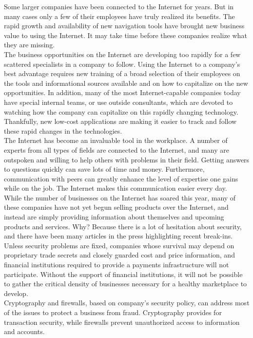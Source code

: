 Some larger companies have been connected to the Internet for years.
But in many cases only a few of their employees have truly realized its
benefits. The rapid growth and availability of new navigation tools
have brought new business value to using the Internet. It may take time
before these companies realize what they are missing.\\

The business opportunities on the Internet are developing too rapidly
for a few scattered specialists in a company to follow. Using the
Internet to a company's best advantage requires new training of a broad
selection of their employees on the tools and informational sources
available and on how to capitalize on the new opportunities. In
addition, many of the most Internet-capable companies today have
special internal teams, or use outside consultants, which are devoted
to watching how the company can capitalize on this rapidly changing
technology. Thankfully, new low-cost applications are making it easier
to track and follow these rapid changes in the technologies.\\

The Internet has become an invaluable tool in the workplace. A number
of experts from all types of fields are connected to the Internet, and
many are outspoken and willing to help others with problems in their
field. Getting answers to questions quickly can save lots of time and
money. Furthermore, communication with peers can greatly enhance the
level of expertise one gains while on the job. The Internet makes this
communication easier every day.\\

While the number of businesses on the Internet has soared this year,
many of these companies have not yet begun selling products over the
Internet, and instead are simply providing information about themselves
and upcoming products and services. Why? Because there is a lot of
hesitation about security, and there have been many articles in the
press highlighting recent break-ins. Unless security problems are
fixed, companies whose survival may depend on proprietary trade secrets
and closely guarded cost and price information, and financial
institutions required to provide a payments infrastructure will not
participate. Without the support of financial institutions, it will not
be possible to gather the critical density of businesses necessary for
a healthy marketplace to develop.\\

Cryptography and firewalls, based on company's security policy, can
address most of the issues to protect a business from fraud.
Cryptography provides for transaction security, while firewalls prevent
unauthorized access to information and accounts.\\

